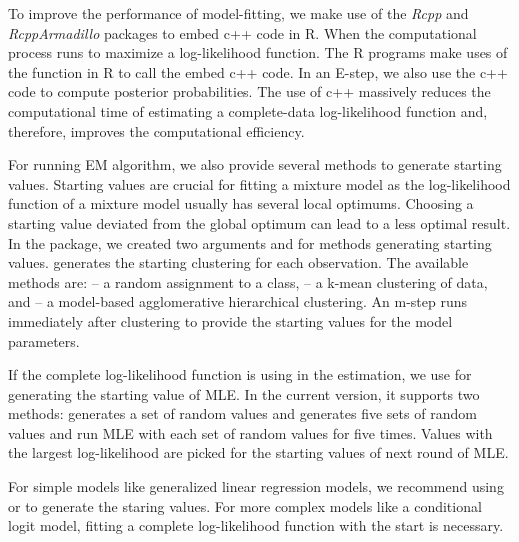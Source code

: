 \documentclass[nojss]{jss}
\begin{document}
   To improve the performance of model-fitting, we make use of the \emph{Rcpp} and \emph{RcppArmadillo} packages to embed c++ code in R. When the computational process runs to maximize a log-likelihood function. The R programs make uses of the  function in R to call the embed c++ code. In an E-step, we also use the c++ code to compute posterior probabilities. The use of c++ massively reduces the computational time of estimating a complete-data log-likelihood function and, therefore, improves the computational efficiency.    
   
   For running EM algorithm, we also provide several methods to generate starting values. Starting values are crucial for fitting a mixture model as the log-likelihood function of a mixture model usually has several local optimums. Choosing a starting value deviated from the global optimum can lead to a less optimal result. In the package, we created two arguments  and  for methods generating starting values.  generates the starting clustering for each observation. The available methods are:  -- a random assignment to a class,  -- a k-mean clustering of data, and  -- a model-based agglomerative hierarchical clustering. An m-step runs immediately after clustering to provide the starting values for the model parameters.
   
   If the complete log-likelihood function is using in the estimation, we use  for generating the starting value of MLE. In the current version, it supports two methods:  generates a set of random values and  generates five sets of random values and run MLE with each set of random values for five times. Values with the largest log-likelihood are picked for the starting values of next round of MLE.  
   
   For simple models like generalized linear regression models, we recommend using  or  to generate the staring values. For more complex models like a conditional logit model, fitting a complete log-likelihood function with the  start is necessary.
   
\end{document}
